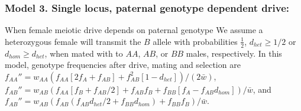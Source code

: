 \documentclass[12pt,letterpaper]{article}
\begin{document}
\subsubsection*{Model 3. Single locus, paternal genotype dependent drive:}
When female meiotic drive depends on paternal genotype
 We assume a heterozygous female will transmit the $B$ allele 
  with probabilities  $\frac{1}{2}$,  $d_{het}\geq 1/2 $ or $d_{hom}\geq d_{het}$, 
 when mated with to $AA$, $AB$, or $BB$ males,  respectively. 
  In this model, genotype frequencies after drive, mating and selection are 
  	$f_{AA}'' =   w_{AA}\left( f_{AA} [2 f_A + f_{AB} ] + f_{AB}^2 [1 - d_{het}] \right)/(2\bar{w})$,
	$f_{AB}'' =   w_{AB}(f_{AA} [f_B + f_{AB}/2] + f_{AB} f_B + f_{BB} [ f_A - f_{AB} d_{hom}])/\bar{w}$, 
	and 	$f_{AB}'' =   w_{AB}(f_{AB} (f_{AB} d_{het}/2 + f_{BB} d_{hom}) + f_{BB} f_B)/\bar{w}$. 
\end{document}

